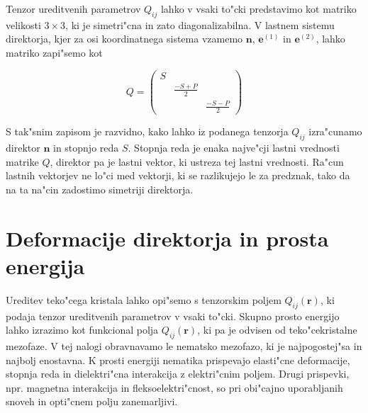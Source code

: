 \documentclass[12pt,twoside,openright,final]{report}
\renewcommand{\vec}{\mathbf}
\begin{document}
Tenzor ureditvenih parametrov $Q_{ij}$ lahko v vsaki to"cki predstavimo kot matriko velikosti $3\times 3$, ki je simetri"cna in zato diagonalizabilna. 
V lastnem sistemu direktorja, kjer za osi koordinatnega sistema vzamemo $\vec n$, $\vec e^{(1)}$ in $\vec e^{(2)}$, lahko matriko zapi"semo kot

\begin{equation}
 Q = \begin{pmatrix}
  S &   & \\
  & \frac{-S+P}{2} & \\
  & & \frac{-S-P}{2}
 \end{pmatrix}
\end{equation}

S tak"snim zapisom je razvidno, kako lahko iz podanega tenzorja $Q_{ij}$ izra"cunamo direktor $\vec n$ in stopnjo reda $S$. 
Stopnja reda je enaka najve"cji lastni vrednosti matrike $Q$, direktor pa je lastni vektor, ki ustreza tej lastni vrednosti. 
Ra"cun lastnih vektorjev ne lo"ci med vektorji, ki se razlikujejo le za predznak, tako da na ta na"cin zadostimo simetriji direktorja. 

\section{Deformacije direktorja in prosta energija}

Ureditev teko"cega kristala lahko opi"semo s tenzorskim poljem $Q_{ij}(\vec r)$, ki podaja tenzor ureditvenih parametrov v vsaki to"cki. 
Skupno prosto energijo lahko izrazimo kot funkcional polja $Q_{ij}(\vec r)$, ki pa je odvisen od teko"cekristalne mezofaze. 
V tej nalogi obravnavamo le nematsko mezofazo, ki je najpogostej"sa in najbolj enostavna. 
K prosti energiji nematika prispevajo elasti"cne deformacije, stopnja reda in dielektri"cna interakcija z elektri"cnim poljem. 
Drugi prispevki, npr. magnetna interakcija in fleksoelektri"cnost, so pri obi"cajno uporabljanih snoveh in opti"cnem polju zanemarljivi.
\end{document}
